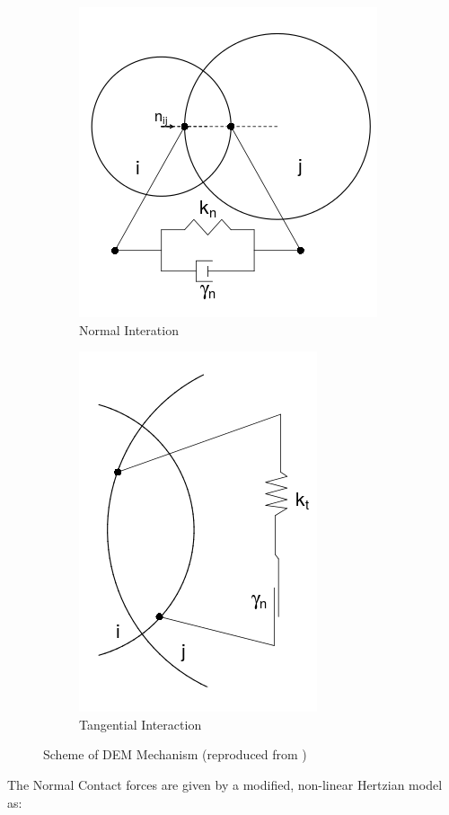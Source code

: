 \begin{figure}[htb!]
 \begin{subfigure}{.5\textwidth}
  \centering
    \includegraphics[width=\linewidth]{figures/normal_interaction.png} 
    \caption{{\small{Normal Interation}}}
 \end{subfigure}
 \begin{subfigure}{.5\textwidth}
  \centering
    \includegraphics[width=.69\linewidth]{figures/tangential_interaction.png}
    \caption{{\small{Tangential Interaction}}}
     \end{subfigure}
 \caption{Scheme of DEM Mechanism (reproduced from \cite{canelas})}
 \label{fig:dem_mechanism}
\end{figure}
\newpage
The Normal Contact forces are given by a modified, non-linear Hertzian model as:

